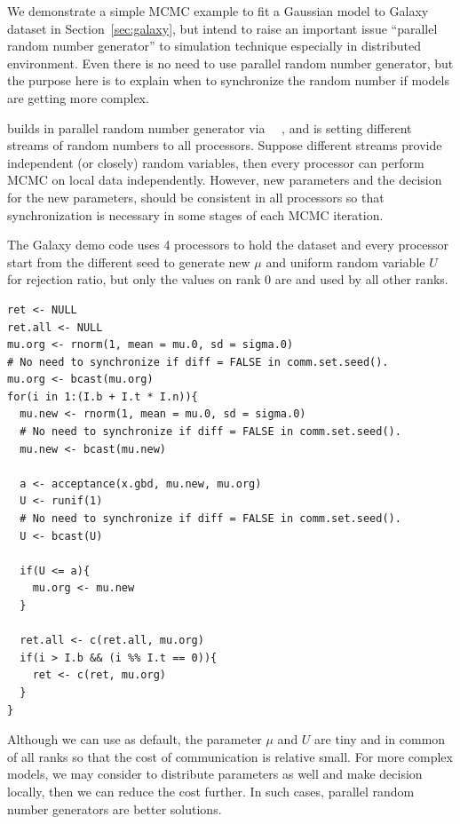 We demonstrate a simple MCMC example to fit a
Gaussian model to Galaxy dataset in Section~\ref{sec:galaxy}, but
intend to raise an important issue ``parallel random number generator''
to simulation technique especially in distributed environment.
Even there is no need to use parallel random number generator, but the
purpose here is to explain when to synchronize the random number
if models are getting more complex.

 builds in parallel random number generator via
~\citep{rlecuyer}~,
and  is setting different
streams of random numbers to all processors. Suppose different streams
provide independent (or closely) random variables, then every processor
can perform MCMC on local data independently. However,
new parameters and the decision for the new parameters,
should be consistent in all processors so that synchronization is necessary
in some stages of each MCMC iteration.

The Galaxy demo code uses 4 processors to
hold the dataset and every processor start from the different seed to generate
new $\mu$ and uniform random variable $U$ for rejection ratio, but only the
values on rank 0 are  and used by all other ranks.
\begin{lstlisting}[language=rr,title=Hastings-Metropolis MCMC]
ret <- NULL
ret.all <- NULL
mu.org <- rnorm(1, mean = mu.0, sd = sigma.0)
# No need to synchronize if diff = FALSE in comm.set.seed().
mu.org <- bcast(mu.org)
for(i in 1:(I.b + I.t * I.n)){
  mu.new <- rnorm(1, mean = mu.0, sd = sigma.0)
  # No need to synchronize if diff = FALSE in comm.set.seed().
  mu.new <- bcast(mu.new)

  a <- acceptance(x.gbd, mu.new, mu.org)
  U <- runif(1)
  # No need to synchronize if diff = FALSE in comm.set.seed().
  U <- bcast(U)

  if(U <= a){
    mu.org <- mu.new
  }

  ret.all <- c(ret.all, mu.org)
  if(i > I.b && (i %% I.t == 0)){
    ret <- c(ret, mu.org)
  }
}
\end{lstlisting}
Although we can use  as default,
the parameter $\mu$ and $U$ are tiny and in common of all ranks so that
the cost of communication is relative small. For more complex models,
we may consider to distribute parameters as well and make decision locally,
then we can reduce the cost further. In such cases, parallel random
number generators are better solutions.



